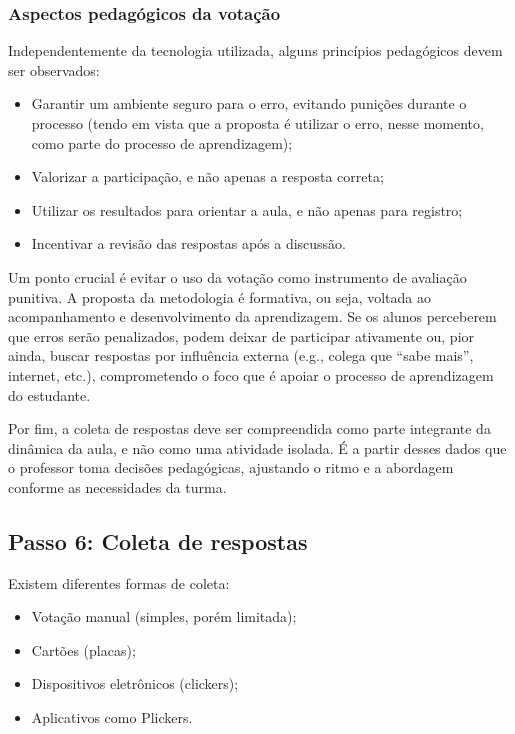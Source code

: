 \subsubsection{Aspectos pedagógicos da votação}

Independentemente da tecnologia utilizada, alguns princípios pedagógicos devem ser observados:

\begin{itemize}
    \item Garantir um ambiente seguro para o erro, evitando punições durante o processo (tendo em vista que a proposta é utilizar o erro, nesse momento, como parte do processo de aprendizagem);
    \item Valorizar a participação, e não apenas a resposta correta;
    \item Utilizar os resultados para orientar a aula, e não apenas para registro;
    \item Incentivar a revisão das respostas após a discussão.
\end{itemize}

Um ponto crucial é evitar o uso da votação como instrumento de avaliação punitiva. A proposta da metodologia é formativa, ou seja, voltada ao acompanhamento e desenvolvimento da aprendizagem. Se os alunos perceberem que erros serão penalizados, podem deixar de participar ativamente ou, pior ainda, buscar respostas por influência externa (e.g., colega que ``sabe mais'', internet, etc.), comprometendo o foco que é apoiar o processo de aprendizagem do estudante.

Por fim, a coleta de respostas deve ser compreendida como parte integrante da dinâmica da aula, e não como uma atividade isolada. É a partir desses dados que o professor toma decisões pedagógicas, ajustando o ritmo e a abordagem conforme as necessidades da turma.

\subsection{Passo 6: Coleta de respostas}

Existem diferentes formas de coleta:

\begin{itemize}
    \item Votação manual (simples, porém limitada);
    \item Cartões (placas);
    \item Dispositivos eletrônicos (clickers);
    \item Aplicativos como Plickers.
\end{itemize}

